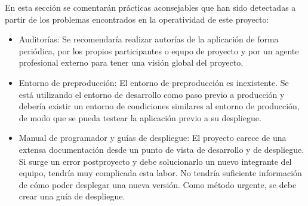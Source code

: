 En esta sección se comentarán prácticas aconsejables que han sido detectadas a partir de los problemas encontrados en la operatividad de este proyecto:

\begin{itemize}
    \item Auditorías: Se recomendaría realizar autorías de la aplicación de forma periódica, por los propios participantes o equpo de proyecto y por un agente profesional externo para tener una visión global del proyecto.
    \item Entorno de preproducción: El entorno de preproducción es inexistente. Se está utilizando el entorno de desarrollo como paso previo a producción y debería existir un entorno de condiciones similares al entorno de producción, de modo que se pueda testear la aplicación previo a su despliegue.
    \item Manual de programador y guías de despliegue: El proyecto carece de una extensa documentación desde un punto de vista de desarrollo y de despliegue. Si surge un error postproyecto y debe solucionarlo un nuevo integrante del equipo, tendría muy complicada esta labor. No tendría suficiente información de cómo poder desplegar una nueva versión. Como método urgente, se debe crear una guía de despliegue.

\end{itemize}



